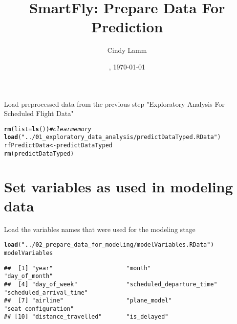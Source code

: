 \documentclass{article}\usepackage[]{graphicx}\usepackage[]{color}
\makeatletter
\newcommand{\hlstr}[1]{\textcolor[rgb]{0.192,0.494,0.8}{#1}}%
\newcommand{\hlcom}[1]{\textcolor[rgb]{0.678,0.584,0.686}{\textit{#1}}}%
\newcommand{\hlstd}[1]{\textcolor[rgb]{0.345,0.345,0.345}{#1}}%
\newcommand{\hlkwb}[1]{\textcolor[rgb]{0.69,0.353,0.396}{#1}}%
\newcommand{\hlkwc}[1]{\textcolor[rgb]{0.333,0.667,0.333}{#1}}%
\newcommand{\hlkwd}[1]{\textcolor[rgb]{0.737,0.353,0.396}{\textbf{#1}}}%
\newenvironment{kframe}{%
 \def\at@end@of@kframe{}%
 \ifinner\ifhmode%
  \def\at@end@of@kframe{\end{minipage}}%
  \begin{minipage}{\columnwidth}%
 \fi\fi%
 \def\FrameCommand##1{\hskip\@totalleftmargin \hskip-\fboxsep
 \colorbox{shadecolor}{##1}\hskip-\fboxsep
     \hskip-\linewidth \hskip-\@totalleftmargin \hskip\columnwidth}%
 \MakeFramed {\advance\hsize-\width
   \@totalleftmargin\z@ \linewidth\hsize
   \@setminipage}}%
 {\par\unskip\endMakeFramed%
 \at@end@of@kframe}
\newenvironment{knitrout}{}{} %
\makeatother
\begin{document}
\date{\currenttime, \today}
\title{SmartFly: Prepare Data For Prediction}
\author{Cindy Lamm}

\maketitle

Load preprocessed data from the previous step "Exploratory Analysis For Scheduled Flight Data"
\begin{knitrout}
\color{fgcolor}\begin{kframe}
\begin{alltt}
\hlkwd{rm}\hlstd{(}\hlkwc{list}\hlstd{=}\hlkwd{ls}\hlstd{())}   \hlcom{#clear memory}
\hlkwd{load}\hlstd{(}\hlstr{"../01_exploratory_data_analysis/predictDataTyped.RData"}\hlstd{)}
\hlstd{rfPredictData} \hlkwb{<-} \hlstd{predictDataTyped}
\hlkwd{rm}\hlstd{(predictDataTyped)}
\end{alltt}
\end{kframe}
\end{knitrout}

\section{Set variables as used in modeling data}

Load the variables names that were used for the modeling stage
\begin{knitrout}
\color{fgcolor}\begin{kframe}
\begin{alltt}
\hlkwd{load}\hlstd{(}\hlstr{"../02_prepare_data_for_modeling/modelVariables.RData"}\hlstd{)}
\hlstd{modelVariables}
\end{alltt}
\begin{verbatim}
##  [1] "year"                     "month"                    "day_of_month"            
##  [4] "day_of_week"              "scheduled_departure_time" "scheduled_arrival_time"  
##  [7] "airline"                  "plane_model"              "seat_configuration"      
## [10] "distance_travelled"       "is_delayed"
\end{verbatim}
\end{kframe}
\end{knitrout}
\end{document}

